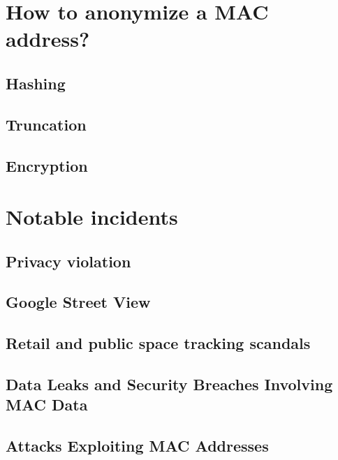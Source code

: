 \documentclass[aps,prb,twocolumn,superscriptaddress,floatfix,longbibliography,nofootinbib]{revtex4-2}
\begin{document}
\section{\label{sec:Methods}How to anonymize a MAC address?}
  \subsection{\label{subsec:Hashing}Hashing}
  \subsection{\label{subsec:Truncation}Truncation}
  \subsection{\label{subsec:Encryption}Encryption}

\section{\label{sec:Notable incidents}Notable incidents}
  \subsection{\label{subsec:Nordstrom}Privacy violation}

  \subsection{\label{subsec:Google}Google Street View}
  \subsection{\label{subsec:London}Retail and public space tracking scandals}
  \subsection{\label{subsec:DataLeaks}Data Leaks and Security Breaches Involving MAC Data}
  \subsection{\label{subsec: Attacks}Attacks Exploiting MAC Addresses}
\end{document}
